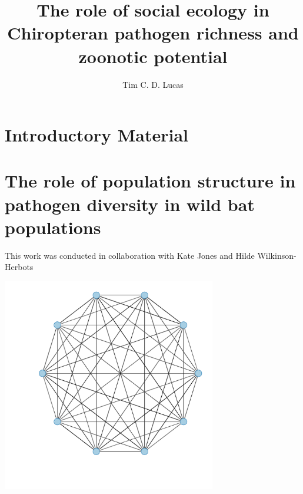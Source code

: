 \documentclass[11pt,phd,a4paper,twoside]{PrettyStanley}
\title{The role of social ecology in Chiropteran pathogen richness and zoonotic potential}
\author{Tim C. D. Lucas}
\begin{document}
\color{prettytext}






\chapter{Introductory Material}
\label{chapterlabel1}




\chapter{The role of population structure in pathogen diversity in wild bat populations}{This work was conducted in collaboration with Kate Jones and Hilde Wilkinson-Herbots}

\label{ch:empirical}

\begin{center}
\includegraphics[width=0.7\textwidth]{imgs/fullyConnected.pdf}
\end{center}

\end{document}
